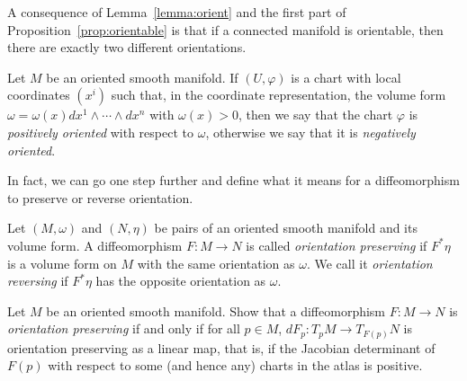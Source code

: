 A consequence of Lemma~\ref{lemma:orient} and the first part of Proposition~\ref{prop:orientable} is that if a connected manifold is orientable, then there are exactly two different orientations.

\begin{definition}
	Let $M$ be an oriented smooth manifold.
	If $(U,\varphi)$ is a chart with local coordinates $(x^i)$ such that, in the coordinate representation, the volume form $\omega = \omega(x) dx^1\wedge\cdots\wedge dx^n$ with $\omega(x) > 0$, then we say that the chart $\varphi$ is \emph{positively oriented} with respect to $\omega$, otherwise we say that it is \emph{negatively oriented}.
\end{definition}

In fact, we can go one step further and define what it means for a diffeomorphism to preserve or reverse orientation.

\begin{definition}
	Let $(M, \omega)$ and $(N, \eta)$ be pairs of an oriented smooth manifold and its volume form.
	A diffeomorphism $F: M \to N$ is called \emph{orientation preserving} if $F^* \eta$ is a volume form on $M$ with the same orientation as $\omega$.
	We call it \emph{orientation reversing} if $F^*\eta$ has the opposite orientation as $\omega$.
\end{definition}

\begin{exercise}
	Let $M$ be an oriented smooth manifold.
	Show that a diffeomorphism $F: M \to N$ is \emph{orientation preserving} if and only if for all $p\in M$, $dF_p : T_p M \to T_{F(p)} N$ is orientation preserving as a linear map, that is, if the Jacobian determinant of $F(p)$ with respect to some (and hence any) charts in the atlas is positive.
\end{exercise}

